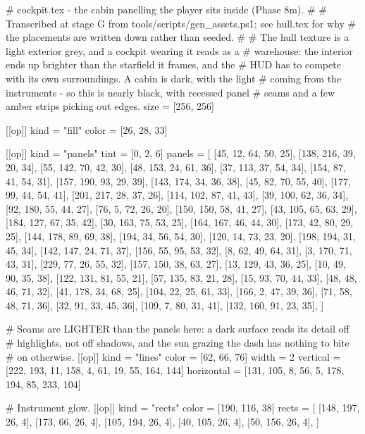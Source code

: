 # cockpit.tex - the cabin panelling the player sits inside (Phase 8m).
#
# Transcribed at stage G from tools/scripts/gen_assets.ps1; see hull.tex for why
# the placements are written down rather than seeded.
#
# The hull texture is a light exterior grey, and a cockpit wearing it reads as a
# warehouse: the interior ends up brighter than the starfield it frames, and the
# HUD has to compete with its own surroundings. A cabin is dark, with the light
# coming from the instruments - so this is nearly black, with recessed panel
# seams and a few amber strips picking out edges.
size = [256, 256]

[[op]]
kind = "fill"
color = [26, 28, 33]

[[op]]
kind = "panels"
tint = [0, 2, 6]
panels = [
  [45, 12, 64, 50, 25],
  [138, 216, 39, 20, 34],
  [55, 142, 70, 42, 30],
  [48, 153, 24, 61, 36],
  [37, 113, 37, 54, 34],
  [154, 87, 41, 54, 31],
  [157, 190, 93, 29, 39],
  [143, 174, 34, 36, 38],
  [45, 82, 70, 55, 40],
  [177, 99, 44, 54, 41],
  [201, 217, 28, 37, 26],
  [114, 102, 87, 41, 43],
  [39, 100, 62, 36, 34],
  [92, 180, 55, 44, 27],
  [76, 5, 72, 26, 20],
  [150, 150, 58, 41, 27],
  [43, 105, 65, 63, 29],
  [184, 127, 67, 35, 42],
  [30, 163, 75, 53, 25],
  [164, 167, 46, 44, 30],
  [173, 42, 80, 29, 25],
  [144, 178, 89, 69, 38],
  [194, 34, 56, 54, 30],
  [120, 14, 73, 23, 20],
  [198, 194, 31, 45, 34],
  [142, 147, 24, 71, 37],
  [156, 55, 95, 53, 32],
  [8, 62, 49, 64, 31],
  [3, 170, 71, 43, 31],
  [229, 77, 26, 55, 32],
  [157, 150, 38, 63, 27],
  [13, 129, 43, 36, 25],
  [10, 49, 90, 35, 38],
  [122, 131, 81, 55, 21],
  [57, 135, 83, 21, 28],
  [15, 93, 70, 44, 33],
  [48, 48, 46, 71, 32],
  [41, 178, 34, 68, 25],
  [104, 22, 25, 61, 33],
  [166, 2, 47, 39, 36],
  [71, 58, 48, 71, 36],
  [32, 91, 33, 45, 36],
  [109, 7, 80, 31, 41],
  [132, 160, 91, 23, 35],
]

# Seams are LIGHTER than the panels here: a dark surface reads its detail off
# highlights, not off shadows, and the sun grazing the dash has nothing to bite
# on otherwise.
[[op]]
kind = "lines"
color = [62, 66, 76]
width = 2
vertical = [222, 193, 11, 158, 4, 61, 19, 55, 164, 144]
horizontal = [131, 105, 8, 56, 5, 178, 194, 85, 233, 104]

# Instrument glow.
[[op]]
kind = "rects"
color = [190, 116, 38]
rects = [
  [148, 197, 26, 4],
  [173, 66, 26, 4],
  [105, 194, 26, 4],
  [40, 105, 26, 4],
  [50, 156, 26, 4],
]
